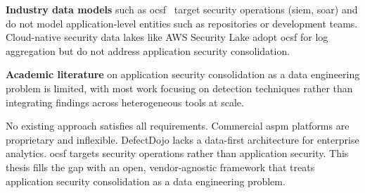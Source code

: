 \textbf{Industry data models} such as \gls{ocsf}~\parencite{OCSF2024} target security operations (\gls{siem}, \gls{soar}) and do not model application-level entities such as repositories or development teams. Cloud-native security data lakes like AWS Security Lake adopt \gls{ocsf} for log aggregation but do not address application security consolidation.

\textbf{Academic literature} on application security consolidation as a data engineering problem is limited, with most work focusing on detection techniques rather than integrating findings across heterogeneous tools at scale.

No existing approach satisfies all requirements. Commercial \gls{aspm} platforms are proprietary and inflexible. DefectDojo lacks a data-first architecture for enterprise analytics. \gls{ocsf} targets security operations rather than application security. This thesis fills the gap with an open, vendor-agnostic framework that treats application security consolidation as a data engineering problem.